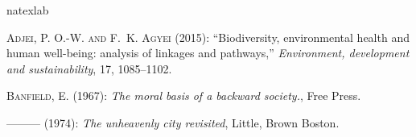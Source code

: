 \documentclass[10pt, letterpaper]{article}
\begin{document}
\begin{spacing}{2}
 
    



% 

\begin{thebibliography}{120}
\newcommand{\enquote}[1]{``#1''}
\expandafter\ifx\csname natexlab\endcsname\relax\def\natexlab#1{#1}\fi

\textsc{Adjei, P. O.-W. and F.~K. Agyei} (2015): \enquote{Biodiversity,
  environmental health and human well-being: analysis of linkages and
  pathways,} \emph{Environment, development and sustainability}, 17,
  1085--1102.

\textsc{Banfield, E.} (1967): \emph{The moral basis of a backward society.},
  Free Press.

---\hspace{-.1pt}---\hspace{-.1pt}--- (1974): \emph{The unheavenly city
  revisited}, Little, Brown Boston.


\end{thebibliography}
\end{spacing}
\end{document}
